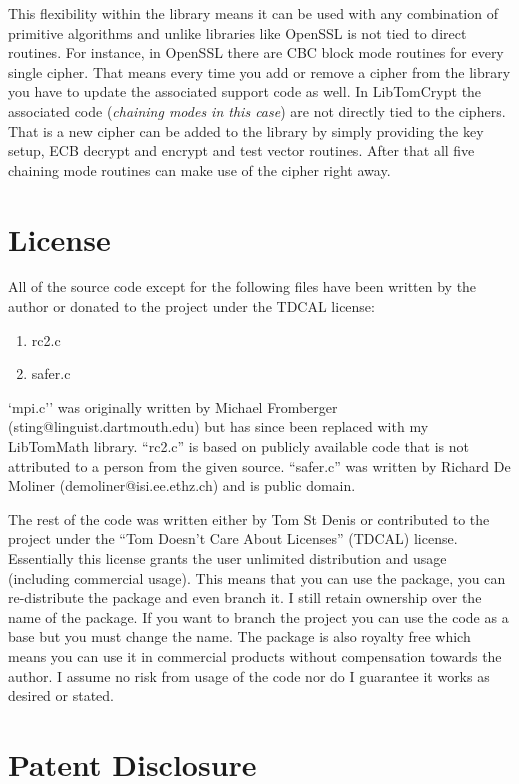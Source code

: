 \documentclass{book}
\begin{document}
This flexibility within the library means it can be used with any combination of primitive algorithms and 
unlike libraries like OpenSSL is not tied to direct routines.  For instance, in OpenSSL there are CBC block
mode routines for every single cipher.  That means every time you add or remove a cipher from the library
you have to update the associated support code as well.  In LibTomCrypt the associated code (\textit{chaining modes in this case})
are not directly tied to the ciphers.  That is a new cipher can be added to the library by simply providing 
the key setup, ECB decrypt and encrypt and test vector routines.  After that all five chaining mode routines
can make use of the cipher right away.


\section{License}

All of the source code except for the following files have been written by the author or donated to the project
under the TDCAL license:

\begin{enumerate}
   \item rc2.c
   \item safer.c
\end{enumerate}

`mpi.c'' was originally written 
by Michael Fromberger (sting@linguist.dartmouth.edu) but has since been replaced with my LibTomMath library.  
``rc2.c'' is based on publicly available code that is not attributed to a person from the given source.  ``safer.c'' 
was written by Richard De Moliner (demoliner@isi.ee.ethz.ch) and is public domain.

The rest of the code was written either by Tom St Denis or contributed to the project under the ``Tom Doesn't Care
About Licenses'' (TDCAL) license.  Essentially this license grants the user unlimited distribution and usage (including
commercial usage).  This means that you can use the package, you can re-distribute the package and even branch it.  I 
still retain ownership over the name of the package.  If you want to branch the project you can use the code as a base
but you must change the name.  The package is also royalty free which means you can use it in commercial products 
without compensation towards the author.  I assume no risk from usage of the code nor do I guarantee it works as 
desired or stated.  

\section{Patent Disclosure}
\end{document}
